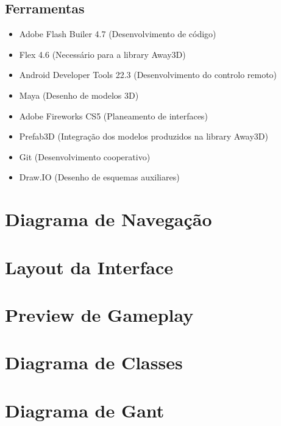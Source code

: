 \documentclass{article}
\begin{document}
\subsection{Ferramentas}
\begin{itemize}
\item Adobe Flash Builer 4.7 (Desenvolvimento de código)
\item Flex 4.6 (Necessário para a library Away3D)
\item Android Developer Tools 22.3 (Desenvolvimento do controlo remoto)
\item Maya (Desenho de modelos 3D)
\item Adobe Fireworks CS5 (Planeamento de interfaces)
\item Prefab3D (Integração dos modelos produzidos na library Away3D)
\item Git (Desenvolvimento cooperativo)
\item Draw.IO (Desenho de esquemas auxiliares)
\end{itemize}

\section{Diagrama de Navegação}


\section{Layout da Interface}

\section{Preview de Gameplay}


\section{Diagrama de Classes}

\section{Diagrama de Gant}
\end{document}
